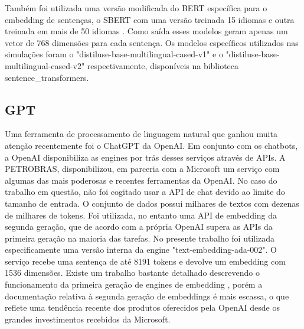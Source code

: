 \documentclass[conference]{IEEEtran}
\begin{document}
  Também foi utilizada uma versão modificada do BERT específica para o embedding de sentenças, o SBERT \cite{reimers-2019-sentence-bert} com uma versão treinada 15 idiomas e outra treinada em mais de 50 idiomas \cite{reimers-2020-multilingual-sentence-bert}. Como saída esses modelos geram apenas um vetor de 768 dimensões para cada sentença. Os modelos específicos utilizados nas simulações foram o "distiluse-base-multilingual-cased-v1" e o "distiluse-base-multilingual-cased-v2" respectivamente, disponíveis na biblioteca sentence\_transformers.

\subsection{GPT}

  Uma ferramenta de processamento de linguagem natural que ganhou muita atenção recentemente foi o ChatGPT da OpenAI. Em conjunto com os chatbots, a OpenAI disponibiliza as engines por trás desses serviços através de APIs. A PETROBRAS, disponibilizou, em parceria com a Microsoft um serviço com algumas das mais poderosas e recentes ferramentas da OpenAI. No caso do trabalho em questão, não foi cogitado usar a API de chat devido ao limite do tamanho de entrada. O conjunto de dados possui milhares de textos com dezenas de milhares de tokens. Foi utilizada, no entanto uma API de embedding da segunda geração, que de acordo com a própria OpenAI supera as APIs da primeira geração na maioria das tarefas. No presente trabalho foi utilizada especificamente uma versão interna da engine "text-embedding-ada-002". O serviço recebe uma sentença de até 8191 tokens e devolve um embedding com 1536 dimensões. Existe um trabalho bastante detalhado descrevendo o funcionamento da primeira geração de engines de embedding \cite{neelakantan2022text}, porém a documentação relativa à segunda geração de embeddings é mais escassa, o que reflete uma tendência recente dos produtos oferecidos pela OpenAI desde os grandes investimentos recebidos da Microsoft. 
\end{document}
